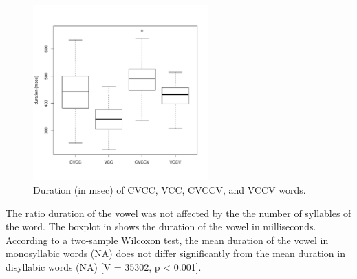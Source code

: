 \documentclass[11pt,a4paper,openany]{memoir}\usepackage[]{graphicx}\usepackage[]{color}
\newenvironment{knitrout}{}{} %
\begin{document}
\begin{figure}
\centering
\begin{knitrout}
\color{fgcolor}
\includegraphics[width=0.6\textwidth]{img/word-duration-1} 

\end{knitrout}
\caption{Duration (in msec) of CVCC, VCC, CVCCV, and VCCV words.}
\label{f:worddur}
\end{figure}



The ratio duration of the vowel was not affected by the the number of syllables of the word.
The boxplot in  shows the duration of the vowel in milliseconds.
According to a two-sample Wilcoxon test, the mean duration of the vowel in monosyllabic words (NA) does not differ significantly from the mean duration in disyllabic words (NA) [V = 35302, p < 0.001].
\end{document}
